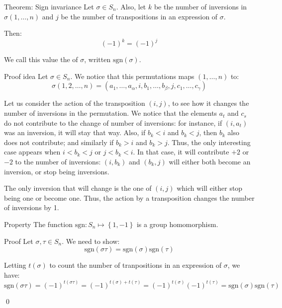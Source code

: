 \documentclass[a4paper]{article}
\begin{document}
\begin{parag}{Theorem: Sign invariance}
    Let $\sigma \in S_n$. Also, let $k$ be the number of inversions in $\sigma\left(1, \ldots, n\right)$ and $j$ be the number of transpositions in an expression of $\sigma$.

    Then: 
    \[\left(-1\right)^{k} = \left(-1\right)^j\]

    We call this value the  of $\sigma$, written $\text{sgn}\left(\sigma\right)$.
    
    \begin{subparag}{Proof idea}
        Let $\sigma \in S_n$. We notice that this permutations maps $\left(1, \ldots, n\right)$ to:
        \[\sigma\left(1, 2, \ldots, n\right) = \left(a_1, \ldots, a_{\alpha}, i, b_1, \ldots, b_{\beta}, j, c_1, \ldots, c_{\gamma}\right)\]

        Let us consider the action of the transposition $\left(i, j\right)$, to see how it changes the number of inversions in the permutation. We notice that the elements $a_t$ and $c_s$ do not contribute to the change of number of inversions: for instance, if $\left(i, a_t\right)$ was an inversion, it will stay that way. Also, if $b_k < i$ and $b_k < j$, then $b_k$ also does not contribute; and similarly if $b_k > i$ and $b_k > j$. Thus, the only interesting case appears when $i < b_k < j$ or $j < b_k < i$. In that case, it will contribute $+2$ or $-2$ to the number of inversions: $\left(i, b_k\right)$ and $\left(b_k, j\right)$ will either both become an inversion, or stop being inversions.

        The only inversion that will change is the one of $\left(i, j\right)$ which will either stop being one or become one. Thus, the action by a transposition changes the number of inversions by 1.
    \end{subparag}
\end{parag}

\begin{parag}{Property}
    The function $\text{sgn}: S_n \mapsto \left\{1, -1\right\}$ is a group homomorphism.

    \begin{subparag}{Proof}
        Let $\sigma, \tau \in S_n$. We need to show:
        \[\text{sgn}\left(\sigma \tau\right) = \text{sgn}\left(\sigma\right)  \text{sgn}\left(\tau\right)\]

        Letting $t\left(\sigma\right)$ to count the number of tranpositions in an expression of $\sigma$, we have:
        \[\text{sgn}\left(\sigma \tau\right) = \left(-1\right)^{t\left(\sigma \tau\right)} = \left(-1\right)^{t\left(\sigma\right) + t\left(\tau\right)} = \left(-1\right)^{t\left(\sigma\right)}\left(-1\right)^{t\left(\tau\right)} = \text{sgn}\left(\sigma\right)\text{sgn}\left(\tau\right)\]

        \qed
    \end{subparag}
\end{parag}
\end{document}
